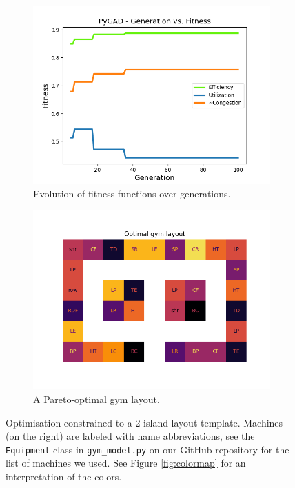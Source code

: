 \documentclass[9pt]{pnas-new}
\begin{document}
\begin{figure}[H]
	\begin{subfigure}{0.495\linewidth}
        \centering
        \includegraphics[width=\textwidth]{fitness_1.png}
        \caption{Evolution of fitness functions over generations.}\label{fig:fitness_1}
    \end{subfigure}
    \begin{subfigure}{0.495\linewidth}
        \centering
        \includegraphics[width=\textwidth]{layout_1.png}
        \caption{A Pareto-optimal gym layout. }\label{fig:layout_1}
    \end{subfigure}
    \caption{Optimisation constrained to a 2-island layout template. Machines (on the right) are labeled with name abbreviations, see the \texttt{Equipment} class in \texttt{gym\_model.py} on our GitHub repository \cite{gymulator} for the list of machines we used. See Figure \ref{fig:colormap} for an interpretation of the colors.}\label{fig:firstTest}
\end{figure}
\end{document}
